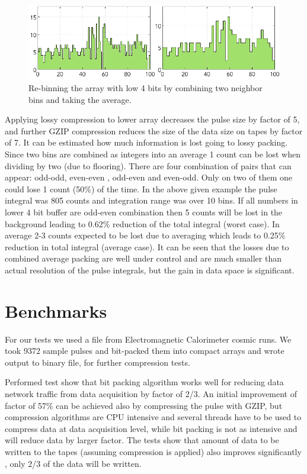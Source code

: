 \documentclass[12pt]{article}
\begin{document}
\begin{figure}[!h]
\begin{center}

 \includegraphics[width=6in]{pics/fadc_pulse_rebinned.png}

 \caption {Re-binning the array with low 4 bits by combining two neighbor bins and taking the average. }
 \label{FADC_PULSE_BITS_REBINNED}
 \end{center}
\end{figure}

Applying lossy compression to lower array decreases the pulse size by factor of  5, and further
GZIP compression reduces the size of the data size on tapes by factor of  7.
It can be estimated how much information is lost going to lossy packing. Since two bins are
combined as integers into an average 1 count can be lost when dividing by two (due to flooring).
There are four combination of pairs that can appear: odd-odd, even-even , odd-even and even-odd.
Only on two of them one could lose 1 count (50\%) of the time. In the above given example the
pulse integral was 805 counts and integration range was over 10 bins. If all numbers in lower
4 bit buffer are odd-even combination then 5 counts will be lost in the background leading
to 0.62\% reduction of the total integral (worst case). In average 2-3 counts expected to be 
lost due to averaging which leads to 0.25\% reduction in total integral (average case).
It can be seen that the losses due to combined average packing are well under control and
are much smaller than actual resolution of the pulse integrals, but the gain in data space 
is significant.

\section{Benchmarks}

For our tests we used a file from Electromagnetic Calorimeter cosmic runs. We took 9372 sample
pulses and bit-packed them into compact arrays and wrote output to binary file, for further 
compression tests.

Performed test show that bit packing algorithm works well for reducing data network traffic 
from data acquisition by factor of 2/3. An initial improvement of factor of 57\% can be achieved 
also by compressing the pulse with GZIP, but compression algorithms are CPU intensive and several
threads have to be used to compress data at data acquisition level, while bit packing is not as intensive
and will reduce data by larger factor. The tests show that amount of data to be written to the tapes 
(assuming compression is applied) also improves significantly , only 2/3 of the data will be written.
\end{document}
